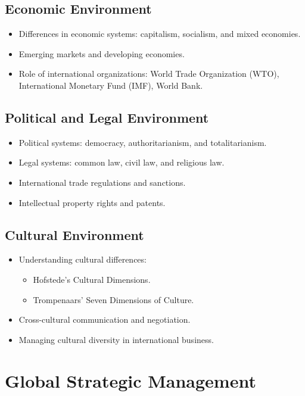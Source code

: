 \subsection{Economic Environment}
\begin{itemize}
    \item Differences in economic systems: capitalism, socialism, and mixed economies.
    \item Emerging markets and developing economies.
    \item Role of international organizations: World Trade Organization (WTO), International Monetary Fund (IMF), World Bank.
\end{itemize}

\subsection{Political and Legal Environment}
\begin{itemize}
    \item Political systems: democracy, authoritarianism, and totalitarianism.
    \item Legal systems: common law, civil law, and religious law.
    \item International trade regulations and sanctions.
    \item Intellectual property rights and patents.
\end{itemize}

\subsection{Cultural Environment}
\begin{itemize}
    \item Understanding cultural differences:
    \begin{itemize}
        \item Hofstede’s Cultural Dimensions.
        \item Trompenaars’ Seven Dimensions of Culture.
    \end{itemize}
    \item Cross-cultural communication and negotiation.
    \item Managing cultural diversity in international business.
\end{itemize}

\section{Global Strategic Management}
